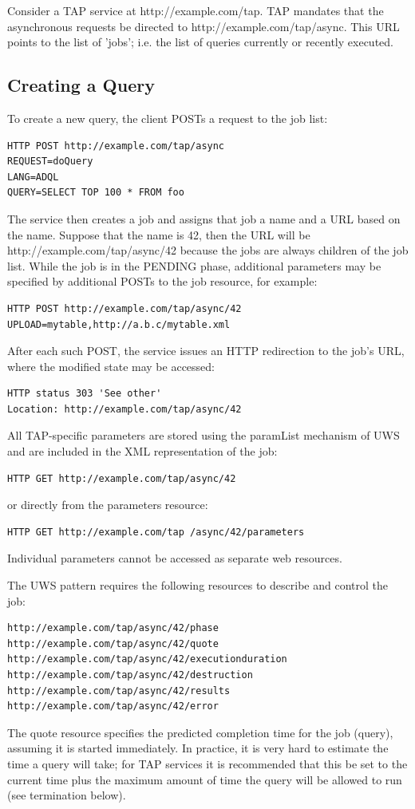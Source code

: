 \documentclass[11pt,a4paper]{ivoa}
\begin{document}
Consider a TAP service at http://example.com/tap. TAP mandates that the 
asynchronous requests be directed to http://example.com/tap/async. This URL 
points to the list of 'jobs'; i.e. the list of queries currently or recently 
executed.

\subsection{Creating a Query}
To create a new query, the client POSTs a request to the job list:

\begin{verbatim}
HTTP POST http://example.com/tap/async
REQUEST=doQuery
LANG=ADQL
QUERY=SELECT TOP 100 * FROM foo
\end{verbatim}

The service then creates a job and assigns that job a name and a URL based on 
the name. Suppose that the name is 42, then the URL will be 
http://example.com/tap/async/42 because the jobs are always children of the job 
list. While the job is in the PENDING phase, additional parameters may be 
specified by additional POSTs to the job resource, for example:

\begin{verbatim}
HTTP POST http://example.com/tap/async/42
UPLOAD=mytable,http://a.b.c/mytable.xml
\end{verbatim}

After each such POST, the service issues an HTTP redirection to the job's URL, 
where the modified state may be accessed:

\begin{verbatim}
HTTP status 303 'See other'
Location: http://example.com/tap/async/42
\end{verbatim}

All TAP-specific parameters are stored using the paramList mechanism of UWS and 
are included in the XML representation of the job:
\begin{verbatim}
HTTP GET http://example.com/tap/async/42
\end{verbatim}
or directly from the parameters resource:
\begin{verbatim}
HTTP GET http://example.com/tap /async/42/parameters
\end{verbatim}
Individual parameters cannot be accessed as separate web resources.

The UWS pattern requires the following resources to describe and control the 
job:
\begin{verbatim}
http://example.com/tap/async/42/phase
http://example.com/tap/async/42/quote
http://example.com/tap/async/42/executionduration
http://example.com/tap/async/42/destruction
http://example.com/tap/async/42/results
http://example.com/tap/async/42/error
\end{verbatim}
The quote resource specifies the predicted completion time for the job (query), 
assuming it is started immediately. In practice, it is very hard to estimate the 
time a query will take; for TAP services it is recommended that this be set to 
the current time plus the maximum amount of time the query will be allowed to 
run (see termination below). 
\end{document}
